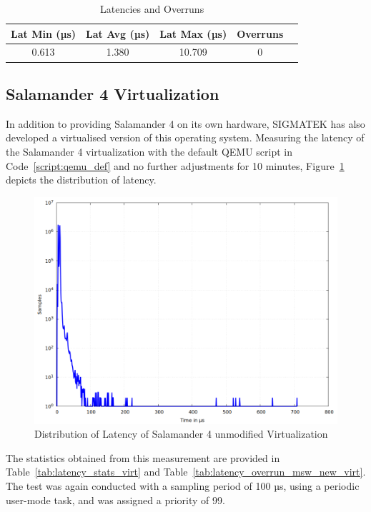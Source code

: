 \documentclass[MMR,Master,english]{twbook}
\begin{document}
\vspace{1em}
\begin{table}[H]
	\centering
	\caption{Latencies and Overruns}
	\label{tab:latency_overrun_msw_hardware}
	\begin{tabular}{|c|c|c|c|c|}
		\hline
		\textbf{Lat Min (µs)} & \textbf{Lat Avg (µs)} & \textbf{Lat Max (µs)} & \textbf{Overruns} \\ \hline
		0.613                 & 1.380                 & 10.709                & 0                 \\ \hline
	\end{tabular}
\end{table}

\subsection{Salamander 4 Virtualization}\label{subsec:salamander4-virtualization}
In addition to providing Salamander 4 on its own hardware, SIGMATEK has also developed a virtualised version of this operating system. Measuring the latency of the Salamander 4 virtualization with the default QEMU script in Code~\ref{script:qemu_def} and no further adjustments for 10 minutes, Figure~\ref{fig:gnuplot_max_latency_default} depicts the distribution of latency.

\begin{figure}[H]
	\centering
	\includegraphics[width=0.7\columnwidth]{masterthesis-documentation/docs/sigmatek/xenomai/1default/gnuplot_max_latency_default.png}
	\caption[Distribution of Latency of Salamander 4 unmodified Virtualization]{Distribution of Latency of Salamander 4 unmodified Virtualization}
	\label{fig:gnuplot_max_latency_default}
\end{figure}

\noindent The statistics obtained from this measurement are provided in Table~\ref{tab:latency_stats_virt} and Table~\ref{tab:latency_overrun_msw_new_virt}. The test was again conducted with a sampling period of 100 µs, using a periodic user-mode task, and was assigned a priority of 99.
\end{document}
